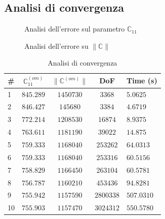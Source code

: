 \documentclass[a4paper,num-refs]{oup-contemporary}
\begin{document}
\label{sec:distribution}

\subsection{Analisi di convergenza}
\label{sec:convergenza}
\begin{figure}[bt!]
	\centering
	\begin{minipage}[b]{0.49\linewidth}
		
		\def\svgwidth{\linewidth}
		
		\caption{Analisi dell'errore sul parametro $\mathbb C_{11}$}\label{fig:convergence}
	\end{minipage} 
	\begin{minipage}[b]{0.49\linewidth}
		\def\svgwidth{\linewidth}
		
		\caption{Analisi dell'errore su $\|\mathbb C\|$}\label{fig:convergence1}
	\end{minipage} 
	\hfill
	\label{fig:convergenza} 
\end{figure}



\begin{table}[bt!]
	\caption{Analisi di convergenza}\label{tab:convergence}
	\begin{tabular}{l c c c l}
		\toprule
		\#&	$\mathbb C_{11}^{(om)}$ & $\| \mathbb C^{(om)}\| $ &DoF &  Time (s)\\
		\midrule
		
		
		1&		$845.289$ &$1450730 $ &$3368 $ &  $ 5.0625 $\\
		2&	$846.427$ &$145680 $& $3384$ &  $4.6719  $\\
		3&	$ 772.214$ &$1208530 $&$ 16874$  &  $ 8.9375 $\\
		4&$ 763.611$ &$ 1181190$&$ 39022$  &$ 14.875$   \\
		5&$ 759.333$ &$1168040 $&$ 253262$  & $ 64.0313$     \\
		6&	$ 759.333$ &$1168040 $& $ 253316$  &$ 60.5156$     \\
		7&	$758.829 $ &$1166450 $&$ 263104$   &$ 60.5781$     \\
		8&	$ 756.787$ &$ 1160210$&$ 453436$ &$ 94.8281 $     \\
		9&	$ 755.942$ &$1157590 $&$2800338 $  &  $ 507.0310$    \\
		10&	$755.903 $ &$ 1157470$&$ 3024312$  & $550.5780 $    \\
		\bottomrule
	\end{tabular}
\end{table}
\end{document}
